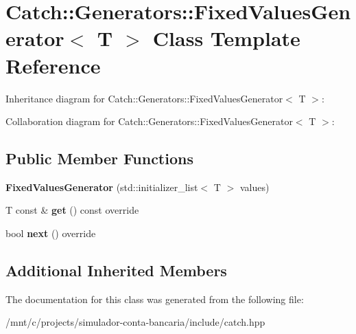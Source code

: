 \hypertarget{classCatch_1_1Generators_1_1FixedValuesGenerator}{}\section{Catch\+:\+:Generators\+:\+:Fixed\+Values\+Generator$<$ T $>$ Class Template Reference}
\label{classCatch_1_1Generators_1_1FixedValuesGenerator}


Inheritance diagram for Catch\+:\+:Generators\+:\+:Fixed\+Values\+Generator$<$ T $>$\+:


Collaboration diagram for Catch\+:\+:Generators\+:\+:Fixed\+Values\+Generator$<$ T $>$\+:
\subsection*{Public Member Functions}
\begin{DoxyCompactItemize}
\item 
\mbox{\label{classCatch_1_1Generators_1_1FixedValuesGenerator_a6e9f473655413c1cb15f079890f06b86}} 
{\bfseries Fixed\+Values\+Generator} (std\+::initializer\+\_\+list$<$ T $>$ values)
\item 
\mbox{\label{classCatch_1_1Generators_1_1FixedValuesGenerator_ad2ea8c959c600386bcc4b2656b40d33e}} 
T const  \& {\bfseries get} () const override
\item 
\mbox{\label{classCatch_1_1Generators_1_1FixedValuesGenerator_a6ce9e3ed045239c7b82873f24bd9cd3b}} 
bool {\bfseries next} () override
\end{DoxyCompactItemize}
\subsection*{Additional Inherited Members}


The documentation for this class was generated from the following file\+:\begin{DoxyCompactItemize}
\item 
/mnt/c/projects/simulador-\/conta-\/bancaria/include/catch.\+hpp\end{DoxyCompactItemize}
